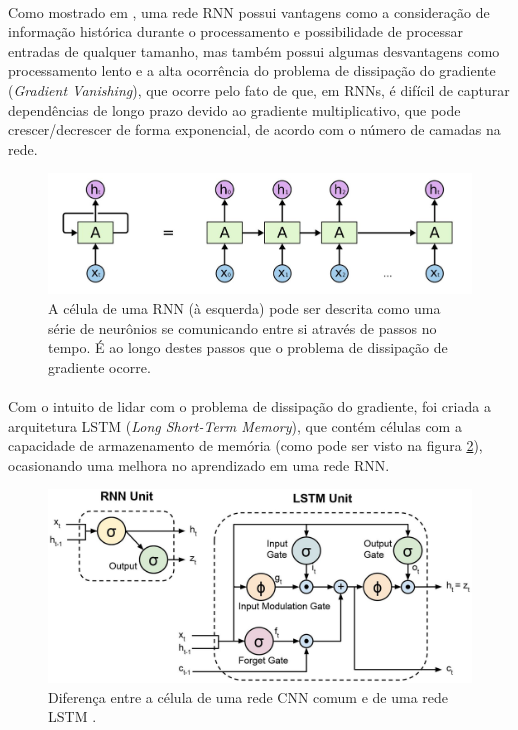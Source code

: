 \documentclass[grad,numbers]{coppe}
\begin{document}
	  	\paragraph{}Como mostrado em \cite{rnn-cheatsheet}, uma rede RNN possui vantagens como a consideração de informação histórica durante o processamento e possibilidade de processar entradas de qualquer tamanho, mas também possui algumas desvantagens como processamento lento e a alta ocorrência do problema de dissipação do gradiente (\textit{Gradient Vanishing}), que ocorre pelo fato de que, em RNNs, é difícil de capturar dependências de longo prazo devido ao gradiente multiplicativo, que pode crescer/decrescer de forma exponencial, de acordo com o número de camadas na rede.
	  	\begin{figure}[h]
	  		\centering
	  		\includegraphics[width=13cm]{rnn-cell.jpg}
	  		\caption{A célula de uma RNN (à esquerda) pode ser descrita como uma série de neurônios se comunicando entre si através de passos no tempo\cite{understanding-lstm}. É ao longo destes passos que o problema de dissipação de gradiente ocorre.}
	  		\label{fig:rnn-cell-fig}
	  	\end{figure}
	  	\paragraph{}Com o intuito de lidar com o problema de dissipação do gradiente, foi criada a arquitetura LSTM (\textit{Long Short-Term Memory})\cite{lstm-paper}, que contém células com a capacidade de armazenamento de memória (como pode ser visto na figura \ref{fig:lstm_rnn_comparisson-fig}), ocasionando uma melhora no aprendizado em uma rede RNN.
	  	\begin{figure}[H]
	  		\centering
	  		\includegraphics[width=12cm]{lstm_rnn_comparisson.jpg}
	  		\caption{Diferença entre a célula de uma rede CNN comum e de uma rede LSTM \cite{lstm-visual}.}
	  		\label{fig:lstm_rnn_comparisson-fig}
	  	\end{figure}
\end{document}
